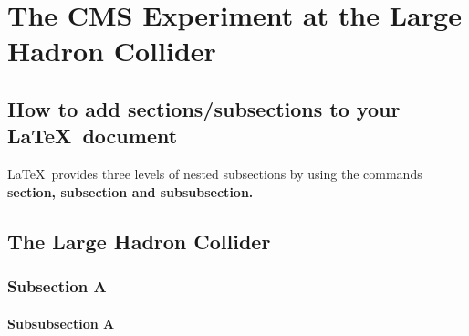 

\chapter{The CMS Experiment at the Large Hadron Collider}  

\section{How to add sections/subsections to your \LaTeX\ document}


\noindent \LaTeX\ provides three levels of nested subsections by using the commands \textbf{section, subsection and subsubsection.} %

\section{The Large Hadron Collider}
\noindent \lipsum[1][1] %

\subsection{Subsection A}
\noindent \lipsum[1][1] %

\subsubsection{Subsubsection A}
\noindent \lipsum[1][1] %


